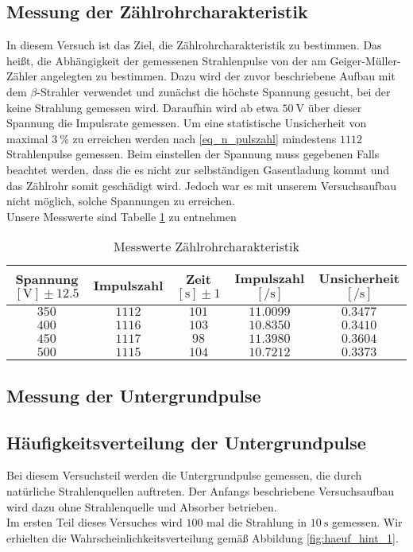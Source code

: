 \subsection{Messung der Zählrohrcharakteristik}
In diesem Versuch ist das Ziel, die Zählrohrcharakteristik zu bestimmen. Das heißt, die Abhängigkeit der gemessenen Strahlenpulse von der am Geiger-Müller-Zähler angelegten zu bestimmen. Dazu wird der zuvor beschriebene Aufbau mit dem $ \beta $-Strahler verwendet und zunächst die höchste Spannung gesucht, bei der keine Strahlung gemessen wird. Daraufhin wird ab etwa $ \SI{50}{\volt} $ über dieser Spannung die Impulsrate gemessen. Um eine statistische Unsicherheit von maximal $ \SI{3}{\percent} $ zu erreichen werden nach \eqref{eq_n_pulszahl} mindestens $ 1112 $ Strahlenpulse gemessen. Beim einstellen der Spannung muss gegebenen Falls beachtet werden, dass die es nicht zur selbständigen Gasentladung kommt und das Zählrohr somit geschädigt wird. Jedoch war es mit unserem Versuchsaufbau nicht möglich, solche Spannungen zu erreichen. \\
Unsere Messwerte sind Tabelle \ref{tab:mess_1} zu entnehmen

\begin{table}[h!]
\begin{tabular}{c|c|c|c|c}
Spannung $ [\si{\volt}] \pm \num{12.5} $ & Impulszahl & Zeit $ [\si{\second}] \pm 1$ & Impulszahl $ [\si{\per\second}] $ & Unsicherheit $ [\si{\per\second}] $ \\ \hline
$ 350 $ & $ 1112 $ & $ 101 $ & $ \num{11.0099} $ & $ \num{0.3477} $ \\
$ 400 $ & $ 1116 $ & $ 103 $ & $ \num{10.8350} $ & $ \num{0.3410} $ \\
$ 450 $ & $ 1117 $ & $ 98 $ & $ \num{11.3980} $ & $ \num{0.3604} $ \\
$ 500 $ & $ 1115 $ & $ 104 $ & $ \num{10.7212} $ & $ \num{0.3373} $ \\
\end{tabular}
\caption{Messwerte Zählrohrcharakteristik}
\label{tab:mess_1}
\end{table}

\subsection{Messung der Untergrundpulse}
\subsection{Häufigkeitsverteilung der Untergrundpulse}
Bei diesem Versuchsteil werden die Untergrundpulse gemessen, die durch natürliche Strahlenquellen auftreten. Der Anfangs beschriebene Versuchsaufbau wird dazu ohne Strahlenquelle und Absorber betrieben. \\
Im ersten Teil dieses Versuches wird $ 100 $ mal die Strahlung in $ \SI{10}{\second} $ gemessen. Wir erhielten die Wahrscheinlichkeitsverteilung gemäß Abbildung \ref{fig:haeuf_hint_1}.

